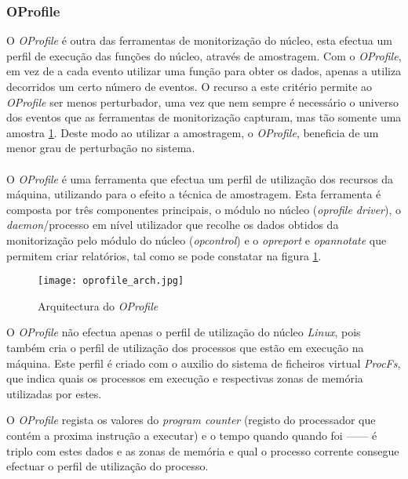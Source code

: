 \subsubsection{OProfile}\label{cap:Oprofile_overview}
O \textit{OProfile} é outra das ferramentas de monitorização do núcleo, esta efectua um perfil de execução das funções do núcleo, através de amostragem. 
Com o \textit{OProfile}, em vez de a cada evento utilizar uma função para obter os dados, apenas a utiliza decorridos um certo número de eventos.
O recurso a este critério permite ao \textit{OProfile} ser menos perturbador, uma vez que nem sempre é necessário o universo dos eventos que as ferramentas de monitorização capturam, mas tão somente uma amostra \ref{fig:oprofile_arch}.
Deste modo ao utilizar a amostragem, o \textit{OProfile}, beneficia de um menor grau de perturbação no sistema\cite{Will:TuninProgrOProf}.

\paragraph*{}
O \textit{OProfile} é uma ferramenta que efectua um perfil de utilização dos recursos da máquina, utilizando para o efeito a técnica de amostragem.
Esta ferramenta é composta por três componentes principais, o módulo no núcleo (\textit{oprofile driver}), o \textit{daemon}/processo em nível utilizador que recolhe os dados obtidos da monitorização pelo módulo do núcleo (\textit{opcontrol}) e o \textit{opreport} e \textit{opannotate} que permitem criar relatórios, tal como se pode constatar na figura \ref{fig:oprofile_arch}.

\begin{figure}[!htb]
       \centering
       \texttt{[image: oprofile\_arch.jpg]}
       \caption{Arquitectura do \textit{OProfile} \cite{Will:TuninProgrOProf}}
	\label{fig:oprofile_arch}
\end{figure}

O \textit{OProfile} não efectua apenas o perfil de utilização do núcleo \textit{Linux}, pois também cria o perfil de utilização dos processos que estão em execução na máquina.
Este perfil é criado com o auxilio do sistema de ficheiros virtual \textit{ProcFs}, que indica quais os processos em execução e respectivas zonas de memória utilizadas por estes.

O \textit{OProfile} regista os valores do \textit{program counter} (registo do processador que contém a proxima instrução a executar) e o tempo quando quando foi  ------ é triplo com estes dados e as zonas de memória e qual o processo corrente consegue efectuar o perfil de utilização do processo.

